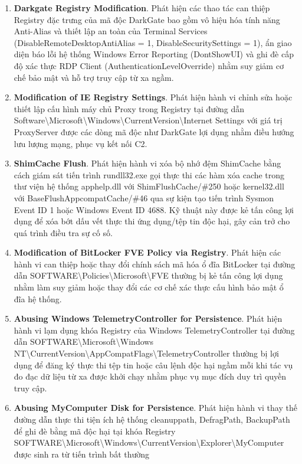 \begin{enumerate}
\item \textbf{Darkgate Registry Modification}. Phát hiện các thao tác can thiệp Registry đặc trưng của mã độc DarkGate bao gồm vô hiệu hóa tính năng Anti-Alias và thiết lập an toàn của Terminal Services (DisableRemoteDesktopAntiAlias = 1, DisableSecuritySettings = 1), ẩn giao diện báo lỗi hệ thống Windows Error Reporting (DontShowUI) và ghi đè cấp độ xác thực RDP Client (AuthenticationLevelOverride) nhằm suy giảm cơ chế bảo mật và hỗ trợ truy cập từ xa ngầm.
\item \textbf{Modification of IE Registry Settings}. Phát hiện hành vi chỉnh sửa hoặc thiết lập cấu hình máy chủ Proxy trong Registry tại đường dẫn Software\textbackslash{}Microsoft\textbackslash{}Windows\textbackslash{}CurrentVersion\textbackslash{}Internet Settings với giá trị ProxyServer được các dòng mã độc như DarkGate lợi dụng nhằm điều hướng lưu lượng mạng, phục vụ kết nối C2.
\item \textbf{ShimCache Flush}. Phát hiện hành vi xóa bộ nhớ đệm ShimCache bằng cách giám sát tiến trình rundll32.exe gọi thực thi các hàm xóa cache trong thư viện hệ thống apphelp.dll với ShimFlushCache/\#250 hoặc kernel32.dll với BaseFlushAppcompatCache/\#46 qua sự kiện tạo tiến trình Sysmon Event ID 1 hoặc Windows Event ID 4688. Kỹ thuật này được kẻ tấn công lợi dụng để xóa bớt dấu vết thực thi ứng dụng/tệp tin độc hại, gây cản trở cho quá trình điều tra sự cố số.
\item \textbf{Modification of BitLocker FVE Policy via Registry}. Phát hiện các hành vi can thiệp hoặc thay đổi chính sách mã hóa ổ đĩa BitLocker tại đường dẫn SOFTWARE\textbackslash{}Policies\textbackslash{}Microsoft\textbackslash{}FVE thường bị kẻ tấn công lợi dụng nhằm làm suy giảm hoặc thay đổi các cơ chế xác thực cấu hình bảo mật ổ đĩa hệ thống.
\item \textbf{Abusing Windows TelemetryController for Persistence}. Phát hiện hành vi lạm dụng khóa Registry của Windows TelemetryController tại đường dẫn SOFTWARE\textbackslash{}Microsoft\textbackslash{}Windows NT\textbackslash{}CurrentVersion\textbackslash{}AppCompatFlags\textbackslash{}TelemetryController thường bị lợi dụng để đăng ký thực thi tệp tin hoặc câu lệnh độc hại ngầm mỗi khi tác vụ đo đạc dữ liệu từ xa được khởi chạy nhằm phục vụ mục đích duy trì quyền truy cập.
\item \textbf{Abusing MyComputer Disk for Persistence}. Phát hiện hành vi thay thế đường dẫn thực thi tiện ích hệ thống cleanuppath, DefragPath, BackupPath để ghi đè bằng mã độc hại tại khóa Registry SOFTWARE\textbackslash{}Microsoft\textbackslash{}Windows\textbackslash{}CurrentVersion\textbackslash{}Explorer\textbackslash{}MyComputer được sinh ra từ tiến trình bất thường

\end{enumerate}
